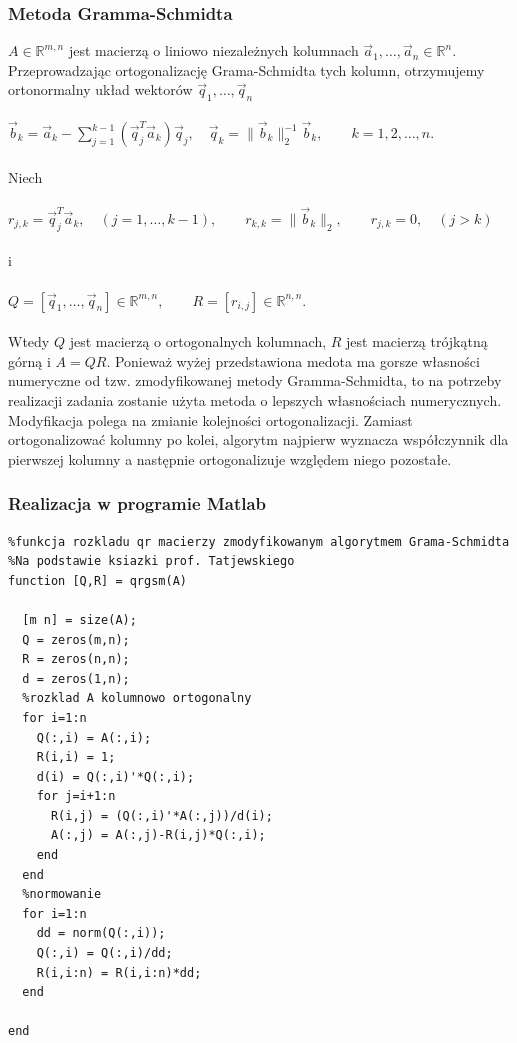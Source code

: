 \documentclass[a4paper, 11pt]{article}
\begin{document}
\subsubsection{Metoda Gramma-Schmidta}
$A \in \mathbb{R}^{m,n}$ jest macierzą o liniowo niezależnych kolumnach $\vec a_1, \dots, \vec a_n \in \mathbb{R}^n$.  Przeprowadzając ortogonalizację Grama-Schmidta tych kolumn, otrzymujemy ortonormalny układ wektorów $\vec q_1, \dots, \vec q_n$ 
\\
\\
$\vec b_k = \vec a_k - \sum_{j=1}^{k-1} (\vec q_j^T \vec a_k ) \vec q_j, 
    \quad \vec q_k = \|\vec b_k\|_2^{-1} \vec b_k, \qquad k = 1,2, \dots, n.$
\\
\\
Niech
\\
\\
$r_{j,k} = \vec q_j^T \vec a_k, \quad (j = 1, \dots, k - 1), \qquad r_{k,k} = \| \vec b_k \|_2,
        \qquad  r_{j,k} = 0, \quad (j > k)$
\\
\\
i
\\
\\
$Q = [\vec q_1, \dots, \vec q_n ] \in \mathbb{R}^{m,n}, \qquad R = [r_{i,j}] \in \mathbb{R}^{n,n}.$
\\
\\
Wtedy $Q$ jest macierzą o ortogonalnych kolumnach, $R$ jest macierzą trójkątną górną i $A = QR$.
Ponieważ wyżej przedstawiona medota ma gorsze własności numeryczne od tzw. zmodyfikowanej metody Gramma-Schmidta, to na potrzeby realizacji zadania zostanie użyta metoda o lepszych własnościach numerycznych. Modyfikacja polega na zmianie kolejności ortogonalizacji. Zamiast ortogonalizować kolumny po kolei, algorytm najpierw wyznacza współczynnik dla pierwszej kolumny a następnie ortogonalizuje względem niego pozostałe. 

\subsubsection{Realizacja w programie Matlab}
\begin{lstlisting}
%funkcja rozkladu qr macierzy zmodyfikowanym algorytmem Grama-Schmidta
%Na podstawie ksiazki prof. Tatjewskiego
function [Q,R] = qrgsm(A)

  [m n] = size(A);
  Q = zeros(m,n);
  R = zeros(n,n);
  d = zeros(1,n); 
  %rozklad A kolumnowo ortogonalny
  for i=1:n
    Q(:,i) = A(:,i);
    R(i,i) = 1; 
    d(i) = Q(:,i)'*Q(:,i);
    for j=i+1:n
      R(i,j) = (Q(:,i)'*A(:,j))/d(i);
      A(:,j) = A(:,j)-R(i,j)*Q(:,i);  
    end 
  end
  %normowanie
  for i=1:n
    dd = norm(Q(:,i));
    Q(:,i) = Q(:,i)/dd;
    R(i,i:n) = R(i,i:n)*dd;
  end
  
end 

\end{lstlisting}
\end{document}
